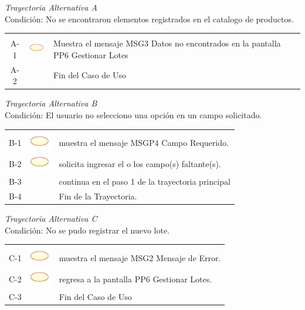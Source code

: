 \documentclass[10pt,spanish]{article}
\providecommand{\tabularnewline}{\\}
\begin{document}
	\textit{Trayectoria Alternativa A}\\
	Condición: No se encontraron elementos registrados en el catalogo de productos.\\
	\begin{tabular}{ccl}
	& & \tabularnewline
	A-1 & \includegraphics{sistema} & Muestra el mensaje MSG3 Datos no encontrados en la pantalla PP6 Gestionar Lotes\tabularnewline	
	A-2 & & Fin del Caso de Uso\tabularnewline
	\end{tabular}	
	
	\textit{Trayectoria Alternativa B}\\
	Condición: El usuario no selecciono una opción en un campo solicitado.\\
	\begin{tabular}{ccl}
	& & \tabularnewline
	B-1 & \includegraphics{sistema} & muestra el mensaje MSGP4 Campo Requerido.\tabularnewline	
	B-2 & \includegraphics{sistema} & solicita ingresar el o los campo(s) faltante(s).\tabularnewline		
	B-3 & & continua en el paso 1 de la trayectoria principal\tabularnewline
	B-4 & & Fin de la Trayectoria.\tabularnewline	
	\end{tabular}	
	
	\textit{Trayectoria Alternativa C}\\
	Condición: No se pudo registrar el nuevo lote.\\
	\begin{tabular}{ccl}
	& & \tabularnewline
	C-1 & \includegraphics{sistema} & muestra el mensaje MSG2 Mensaje de Error.\tabularnewline	
	C-2 & \includegraphics{sistema} & regresa a la pantalla PP6 Gestionar Lotes.\tabularnewline		
	C-3 & & Fin del Caso de Uso\tabularnewline
	\end{tabular}			
	\newpage
\end{document}
